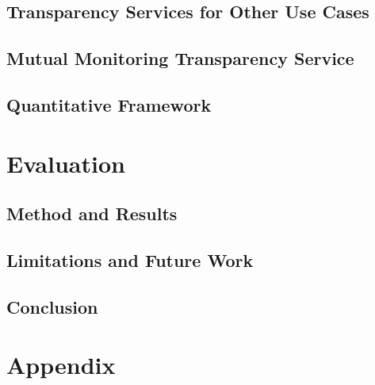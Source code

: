 \documentclass{jdf}
\begin{document}
\subsection{Transparency Services for Other Use Cases}

\subsection{Mutual Monitoring Transparency Service}

\subsection{Quantitative Framework}

\section{Evaluation}

\subsection{Method and Results}

\subsection{Limitations and Future Work}

\subsection{Conclusion}

\section{Appendix}



\end{document}
